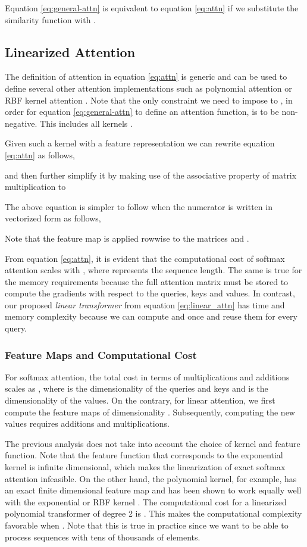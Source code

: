 \documentclass{article}
\newcommand{\linear}{\emph{linear transformer}}
\begin{document}
Equation \ref{eq:general-attn} is equivalent to equation \ref{eq:attn} if we
substitute the similarity function with .

\subsection{Linearized Attention} \label{sec:method-linear}

The definition of attention in equation \ref{eq:attn} is generic and can be
used to define several other attention implementations such as polynomial
attention or RBF kernel attention \cite{tsai2019transformer}. Note that the
only constraint we need to impose to , in order for
equation \ref{eq:general-attn} to define an attention function, is to be
non-negative. This includes all kernels .

Given such a kernel with a feature representation  we can rewrite
equation \ref{eq:attn} as follows,

and then further simplify it by making use of the associative property of
matrix multiplication to

The above equation is simpler to follow when the numerator is written in
vectorized form as follows,

Note that the feature map  is applied rowwise to
the matrices  and .

From equation \ref{eq:attn}, it is evident that the computational cost of
softmax attention scales with , where  represents the sequence
length. The same is true for the memory requirements because the full attention
matrix must be stored to compute the gradients with respect to the queries,
keys and values.
In contrast, our proposed \linear{} from equation \ref{eq:linear_attn} has
time and memory complexity  because we can compute  and  once and reuse them for every
query.

\subsubsection{Feature Maps and Computational Cost} \label{sec:fmap}

For softmax attention, the total cost in terms of multiplications and
additions scales as , where  is the
dimensionality of the queries and keys and  is the dimensionality of the
values. On the contrary, for linear attention, we first compute the feature
maps of dimensionality . Subsequently, computing the new values requires
 additions and multiplications.

The previous analysis does not take into account the choice of kernel and
feature function. Note that the feature function that corresponds to the
exponential kernel is infinite dimensional, which makes the linearization of
exact softmax attention infeasible. On the other hand, the polynomial kernel,
for example, has an exact finite dimensional feature map and has been shown to
work equally well with the exponential or RBF kernel
\cite{tsai2019transformer}. The computational cost for a linearized polynomial
transformer of degree 2 is . This makes the computational
complexity favorable when . Note that this is true in practice since
we want to be able to process sequences with tens of thousands of elements.
\end{document}
